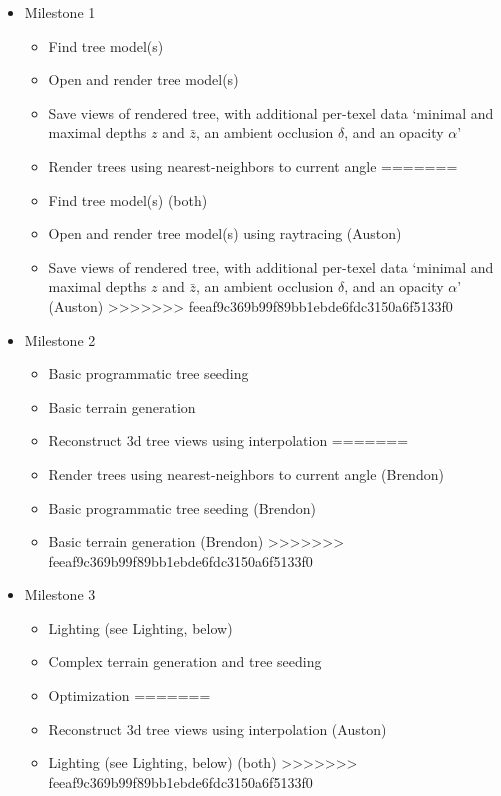 \documentclass{article}
\begin{document}
\begin{itemize}
\item Milestone 1
\begin{itemize}
<<<<<<< HEAD
\item Find tree model(s)
\item Open and render tree model(s)
\item Save views of rendered tree, with additional per-texel data ‘minimal and maximal depths $z$ and $\bar{z}$, an ambient occlusion $\delta$, and an opacity $\alpha$’\cite{trees}
\item Render trees using nearest-neighbors to current angle
=======
\item Find tree model(s) (both)
\item Open and render tree model(s) using raytracing (Auston)
\item Save views of rendered tree, with additional per-texel data ‘minimal and maximal depths $z$ and $\bar{z}$, an ambient occlusion $\delta$, and an opacity $\alpha$’\cite{trees} (Auston)
>>>>>>> feeaf9c369b99f89bb1ebde6fdc3150a6f5133f0
\end{itemize}

\item Milestone 2
\begin{itemize}
<<<<<<< HEAD
\item Basic programmatic tree seeding
\item Basic terrain generation
\item Reconstruct 3d tree views using interpolation
=======
\item Render trees using nearest-neighbors to current angle (Brendon)
\item Basic programmatic tree seeding (Brendon)
\item Basic terrain generation (Brendon)
>>>>>>> feeaf9c369b99f89bb1ebde6fdc3150a6f5133f0
\end{itemize}

\item Milestone 3
\begin{itemize}
<<<<<<< HEAD
\item Lighting (see Lighting, below)
\item Complex terrain generation and tree seeding
\item Optimization
=======
\item Reconstruct 3d tree views using interpolation (Auston)
\item Lighting (see Lighting, below) (both)
>>>>>>> feeaf9c369b99f89bb1ebde6fdc3150a6f5133f0
\end{itemize}


\end{itemize}
\end{document}
